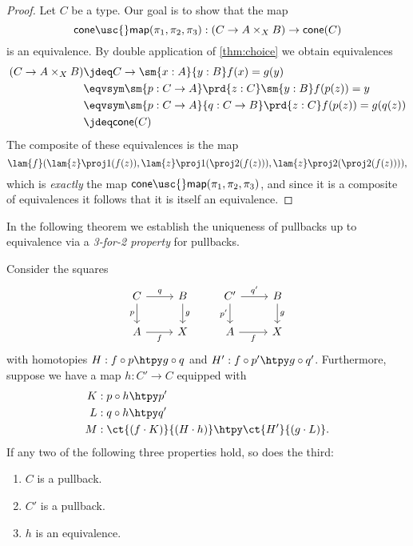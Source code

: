 \begin{proof}
Let $C$ be a type. Our goal is to show that the map
\begin{equation*}
\mathsf{cone\usc{}map}(\pi_1,\pi_2,\pi_3): (C\to A\times_X B)\to \mathsf{cone}(C)
\end{equation*}
is an equivalence. 
By double application of \cref{thm:choice} we obtain equivalences
\begin{align*}
(C\to A\times_X B) & \jdeq C\to \sm{x:A}{y:B}f(x)=g(y) \\
& \eqvsym \sm{p:C\to A}\prd{z:C}\sm{y:B} f(p(z))= y \\
& \eqvsym \sm{p:C\to A}{q:C\to B}\prd{z:C} f(p(z))= g(q(z)) \\
& \jdeq \mathsf{cone}(C)
\end{align*}
The composite of these equivalences is the map
\begin{equation*}
\lam{f}(\lam{z}\proj 1(f(z)),\lam{z} \proj 1(\proj 2(f(z))),\lam{z}\proj 2(\proj 2(f(z)))),
\end{equation*}
which is \emph{exactly} the map $\mathsf{cone\usc{}map}(\pi_1,\pi_2,\pi_3)$, and since it is a composite of equivalences it follows that it is itself an equivalence.
\end{proof}

In the following theorem we establish the uniqueness of pullbacks up to equivalence via a \emph{3-for-2 property} for pullbacks.

\begin{thm}\label{thm:pb_3for2}
Consider the squares
\begin{equation*}
\begin{tikzcd}
C \arrow[r,"q"] \arrow[d,swap,"p"] & B \arrow[d,"g"] & {C'} \arrow[r,"{q'}"] \arrow[d,swap,"{p'}"] & B \arrow[d,"g"] \\
A \arrow[r,swap,"f"] & X & A \arrow[r,swap,"f"] & X
\end{tikzcd}
\end{equation*}
with homotopies $H:f\circ p \htpy g\circ q$ and $H':f\circ p'\htpy g\circ q'$.
Furthermore, suppose we have a map $h:C'\to C$ equipped with
\begin{align*}
K & : p\circ h \htpy p' \\
L & : q\circ h \htpy q' \\
M & : \ct{(f\cdot K)}{(H\cdot h)} \htpy \ct{H'}{(g\cdot L)}.
\end{align*}
If any two of the following three properties hold, so does the third:
\begin{enumerate}
\item $C$ is a pullback.
\item $C'$ is a pullback.
\item $h$ is an equivalence.
\end{enumerate}
\end{thm}

